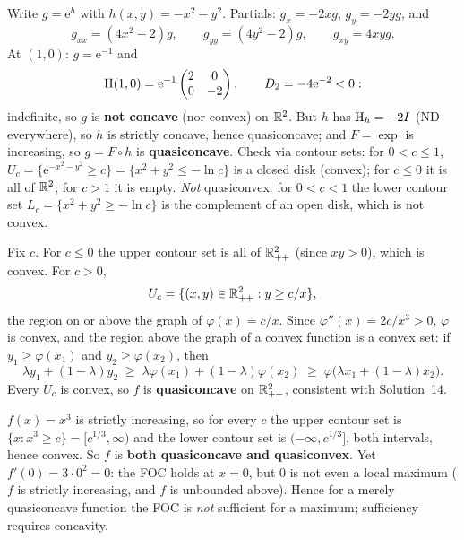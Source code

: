 \begin{solutions}
  \item Write $g=\mathrm{e}^{h}$ with $h(x,y)=-x^{2}-y^{2}$. Partials:
        $g_x=-2xg$, $g_y=-2yg$, and
        \[
          g_{xx}=(4x^{2}-2)g, \qquad g_{yy}=(4y^{2}-2)g, \qquad
          g_{xy}=4xyg .
        \]
        At $(1,0)$: $g=\mathrm{e}^{-1}$ and
        \[
          \operatorname{H}(1,0)=\mathrm{e}^{-1}\begin{pmatrix}2&0\\0&-2\end{pmatrix},
          \qquad D_2=-4\mathrm{e}^{-2}<0 :
        \]
        indefinite, so $g$ is \textbf{not concave} (nor convex) on
        $\mathbb{R}^{2}$. But $h$ has $\operatorname{H}_h=-2I$ (ND everywhere), so $h$ is
        strictly concave, hence quasiconcave; and $F=\exp$ is increasing,
        so $g=F\circ h$ is \textbf{quasiconcave}. Check via contour sets:
        for $0<c\le1$,
        $U_c=\{\mathrm{e}^{-x^{2}-y^{2}}\ge c\}
        =\{x^{2}+y^{2}\le-\ln c\}$ is a closed disk (convex); for $c\le0$
        it is all of $\mathbb{R}^{2}$; for $c>1$ it is empty. \emph{Not}
        quasiconvex: for $0<c<1$ the lower contour set
        $L_c=\{x^{2}+y^{2}\ge-\ln c\}$ is the complement of an open disk,
        which is not convex.

  \item Fix $c$. For $c\le0$ the upper contour set is all of
        $\mathbb{R}^{2}_{++}$ (since $xy>0$), which is convex. For $c>0$,
        \[
          U_c=\{(x,y)\in\mathbb{R}^{2}_{++}: y\ge c/x\},
        \]
        the region on or above the graph of $\varphi(x)=c/x$. Since
        $\varphi''(x)=2c/x^{3}>0$, $\varphi$ is convex, and the region
        above the graph of a convex function is a convex set: if
        $y_1\ge\varphi(x_1)$ and $y_2\ge\varphi(x_2)$, then
        \[
          \lambda y_1+(1-\lambda)y_2
          \;\ge\; \lambda\varphi(x_1)+(1-\lambda)\varphi(x_2)
          \;\ge\; \varphi\bigl(\lambda x_1+(1-\lambda)x_2\bigr).
        \]
        Every $U_c$ is convex, so $f$ is \textbf{quasiconcave} on
        $\mathbb{R}^{2}_{++}$, consistent with Solution~14.

  \item $f(x)=x^{3}$ is strictly increasing, so for every $c$ the upper
        contour set is $\{x:x^{3}\ge c\}=[c^{1/3},\infty)$ and the lower
        contour set is $(-\infty,c^{1/3}]$, both intervals, hence
        convex. So $f$ is \textbf{both quasiconcave and quasiconvex}.
        Yet $f'(0)=3\cdot0^{2}=0$: the FOC holds at $x=0$, but $0$ is not
        even a local maximum ($f$ is strictly increasing, and $f$ is
        unbounded above). Hence for a merely quasiconcave function the
        FOC is \emph{not} sufficient for a maximum; sufficiency
        requires concavity.


\end{solutions}
